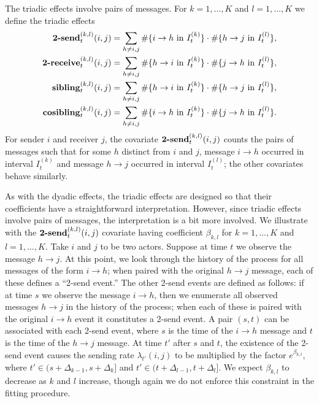 \documentclass[final]{statsoc}
\begin{document}
The triadic effects involve pairs of messages.  For $k = 1, \dotsc, K$ and $l = 1, \dotsc, K$ we define the triadic effects
\begin{align*}
  \text{\textbf{2-send}}^{(k,l)}_t(i,j)
    &= \sum_{h \neq i,j}
      \#\{ i \to h \text{ in } I_t^{(k)} \}
      \cdot \#\{ h \to j \text{ in } I_t^{(l)} \}, \\
  \text{\textbf{2-receive}}^{(k,l)}_t(i,j)
    &= \sum_{h \neq i,j}
      \#\{ h \to i \text{ in } I_t^{(k)} \}
      \cdot \#\{ j \to h \text{ in } I_t^{(l)} \}, \\
  \text{\textbf{sibling}}^{(k,l)}_t(i,j)
    &= \sum_{h \neq i,j}
      \#\{ h \to i \text{ in } I_t^{(k)} \}
      \cdot \#\{ h \to j \text{ in } I_t^{(l)} \}, \\
  \text{\textbf{cosibling}}^{(k,l)}_t(i,j)
    &= \sum_{h \neq i,j}
      \#\{ i \to h \text{ in } I_t^{(k)} \}
      \cdot \#\{ j \to h \text{ in } I_t^{(l)} \}.
\end{align*}
For sender $i$ and receiver $j$, the covariate
$\text{\textbf{2-send}}^{(k,l)}_t(i,j)$ counts the pairs of messages such that for some $h$ distinct from $i$ and $j$, message $i \to h$ occurred in interval $I_t^{(k)}$ and message $h \to j$ occurred in interval $I_t^{(l)}$; the other covariates behave similarly.

As with the dyadic effects, the triadic effects are designed so that their
coefficients have a straightforward interpretation.  However, since triadic
effects involve pairs of messages, the interpretation is a bit more involved.
We illustrate with the $\text{\textbf{2-send}}^{(k,l)}_t(i,j)$ covariate
having coefficient $\beta_{k,l}$ for $k = 1, \dotsc, K$ and $l = 1, \dotsc,
K$.  Take $i$ and $j$ to be two actors.  Suppose at time $t$ we observe the
message $h \to j$.  At this point, we look through the history of the process
for all messages of the form $i \to h$; when paired with the original $h \to
j$ message, each of these defines a ``2-send event.''  The other 2-send events
are defined as follows: if at time $s$ we observe the message $i \to h$, then
we enumerate all observed messages $h \to j$ in the history of the process;
when each of these is paired with the original $i \to h$ event it constitutes
a 2-send event.  A pair $(s,t)$ can be associated with each 2-send event,
where $s$ is the time of the $i \to h$ message and $t$ is the time of the $h
\to j$ message.  At time $t'$ after $s$ and $t$, the existence of the 2-send
event causes the sending rate $\lambda_{t'}(i,j)$ to be multiplied by the
factor $e^{\beta_{k,l}}$, where $t' \in (s + \Delta_{k-1}, s + \Delta_{k}]$
and $t' \in (t + \Delta_{l-1}, t + \Delta_l]$.  We expect $\beta_{k,l}$ to
decrease as $k$ and $l$ increase, though again we do not enforce this constraint in
the fitting procedure.
\end{document}
